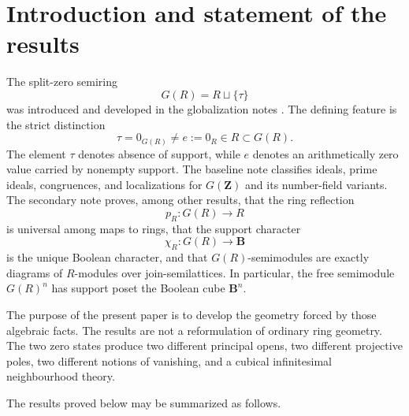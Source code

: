 \documentclass[11pt]{amsart}
\numberwithin{equation}{section}
\theoremstyle{definition}
\newcommand{\B}{\mathbf B}
\newcommand{\Z}{\mathbf Z}
\begin{document}
\maketitle
\tableofcontents

\section{Introduction and statement of the results}

The split-zero semiring
\[
G(R)=R\sqcup\{\tau\}
\]
was introduced and developed in the globalization notes \cite{Globalization,Secondary}.  The defining feature is the strict distinction
\[
\tau=0_{G(R)}\neq e:=0_R\in R\subset G(R).
\]
The element $\tau$ denotes absence of support, while $e$ denotes an arithmetically zero value carried by nonempty support.  The baseline note \cite{Globalization} classifies ideals, prime ideals, congruences, and localizations for $G(\Z)$ and its number-field variants.  The secondary note \cite{Secondary} proves, among other results, that the ring reflection
\[
p_R:G(R)\longrightarrow R
\]
is universal among maps to rings, that the support character
\[
\chi_R:G(R)\longrightarrow\B
\]
is the unique Boolean character, and that $G(R)$-semimodules are exactly diagrams of $R$-modules over join-semilattices.  In particular, the free semimodule $G(R)^n$ has support poset the Boolean cube $\B^n$.

The purpose of the present paper is to develop the geometry forced by those algebraic facts.  The results are not a reformulation of ordinary ring geometry.  The two zero states produce two different principal opens, two different projective poles, two different notions of vanishing, and a cubical infinitesimal neighbourhood theory.

The results proved below may be summarized as follows.
\end{document}
